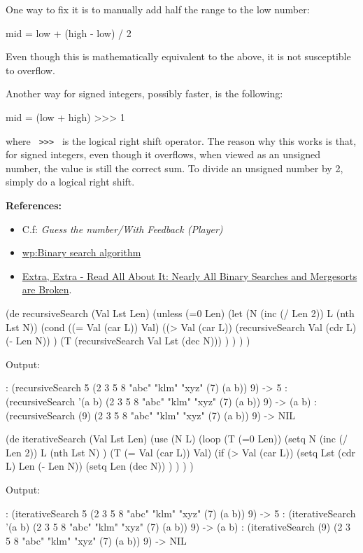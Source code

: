 One way to fix it is to manually add half the range to the low number:

\begin{wideverbatim}
mid = low + (high - low) / 2
\end{wideverbatim}

Even though this is mathematically equivalent to the above, it is not
susceptible to overflow.

Another way for signed integers, possibly faster, is the following:

\begin{wideverbatim}
mid = (low + high) >>> 1
\end{wideverbatim}

where \texttt{ \textgreater{}\textgreater{}\textgreater{} } is the
logical right shift operator. The reason why this works is that, for
signed integers, even though it overflows, when viewed as an unsigned
number, the value is still the correct sum. To divide an unsigned number
by 2, simply do a logical right shift.

\textbf{References:}\\

\begin{itemize}
\item
  C.f: \emph{Guess the number/With Feedback (Player)}
\item
  \href{http://en.wikipedia.org/wiki/Binary\_search\_algorithm}{wp:Binary
  search algorithm}
\item
  \href{http://googleresearch.blogspot.com/2006/06/extra-extra-read-all-about-it-nearly.html}{Extra,
  Extra - Read All About It: Nearly All Binary Searches and Mergesorts
  are Broken}.
\end{itemize}



\begin{wideverbatim}

(de recursiveSearch (Val Lst Len)
   (unless (=0 Len)
      (let (N (inc (/ Len 2))  L (nth Lst N))
         (cond
            ((= Val (car L)) Val)
            ((> Val (car L))
               (recursiveSearch Val (cdr L) (- Len N)) )
            (T (recursiveSearch Val Lst (dec N))) ) ) ) )

Output:

: (recursiveSearch 5 (2 3 5 8 "abc" "klm" "xyz" (7) (a b)) 9)
-> 5
: (recursiveSearch '(a b) (2 3 5 8 "abc" "klm" "xyz" (7) (a b)) 9)
-> (a b)
: (recursiveSearch (9) (2 3 5 8 "abc" "klm" "xyz" (7) (a b)) 9)
-> NIL

(de iterativeSearch (Val Lst Len)
   (use (N L)
      (loop
         (T (=0 Len))
         (setq
            N (inc (/ Len 2))
            L (nth Lst N) )
         (T (= Val (car L)) Val)
         (if (> Val (car L))
            (setq Lst (cdr L)  Len (- Len N))
            (setq Len (dec N)) ) ) ) )

Output:

: (iterativeSearch 5 (2 3 5 8 "abc" "klm" "xyz" (7) (a b)) 9)
-> 5
: (iterativeSearch '(a b) (2 3 5 8 "abc" "klm" "xyz" (7) (a b)) 9)
-> (a b)
: (iterativeSearch (9) (2 3 5 8 "abc" "klm" "xyz" (7) (a b)) 9)
-> NIL

\end{wideverbatim}

